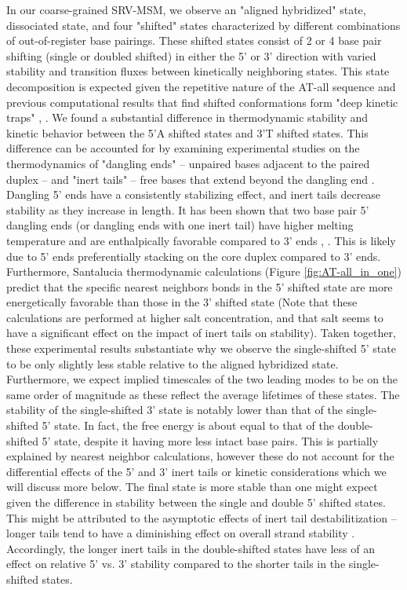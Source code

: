 \documentclass[journal=jpcbfk,manuscript=article]{achemso}
\begin{document}
In our coarse-grained SRV-MSM, we observe an "aligned hybridized" state, dissociated state, and four "shifted" states characterized by different combinations of out-of-register base pairings. These shifted states consist of 2 or 4 base pair shifting (single or doubled shifted) in either the 5' or 3' direction with varied stability and transition fluxes between kinetically neighboring states. This state decomposition is expected given the repetitive nature of the AT-all sequence and previous computational results that find shifted conformations form "deep kinetic traps" \citep{Xiao2019}, \citep{Phys2014}. We found a substantial difference in thermodynamic stability and kinetic behavior between the 5'A shifted states and 3'T shifted states. This difference can be accounted for by examining experimental studies on the thermodynamics of "dangling ends" -- unpaired bases adjacent to the paired duplex -- and "inert tails" -- free bases that extend beyond the dangling end \citep{Michele2014EHybridization}. Dangling 5' ends have a consistently stabilizing effect, and inert tails decrease stability as they increase in length. It has been shown that two base pair 5' dangling ends (or dangling ends with one inert tail) have higher melting temperature and are enthalpically favorable compared to 3' ends \citep{Senior1988InfluenceDuplexes}, \citep{Dickman2012ThermodynamicDNAs}. This is likely due to 5' ends preferentially stacking on the core duplex compared to 3' ends. Furthermore, Santalucia thermodynamic calculations (Figure \ref{fig:AT-all_in_one}) predict that the specific nearest neighbors bonds in the 5' shifted state are more energetically favorable than those in the 3' shifted state \citep{Allawi1998NearestDNA} (Note that these calculations are performed at higher salt concentration, and that salt seems to have a significant effect on the impact of inert tails on stability). Taken together, these experimental results substantiate why we observe the single-shifted 5' state to be only slightly less stable relative to the aligned hybridized state. Furthermore, we expect implied timescales of the two leading modes to be on the same order of magnitude as these reflect the average lifetimes of these states. The stability of the single-shifted 3' state is notably lower than that of the single-shifted 5' state. In fact, the free energy is about equal to that of the double-shifted 5' state, despite it having more less intact base pairs. This is partially explained by nearest neighbor calculations, however these do not account for the differential effects of the 5' and 3' inert tails or kinetic considerations which we will discuss more below. The final state is more stable than one might expect given the difference in stability between the single and double 5' shifted states. This might be attributed to the asymptotic effects of inert tail destabilitization -- longer tails tend to have a diminishing effect on overall strand stability \citep{Michele2014EHybridization}. Accordingly, the longer inert tails in the double-shifted states have less of an effect on relative 5' vs. 3' stability compared to the shorter tails in the single-shifted states.
\end{document}

